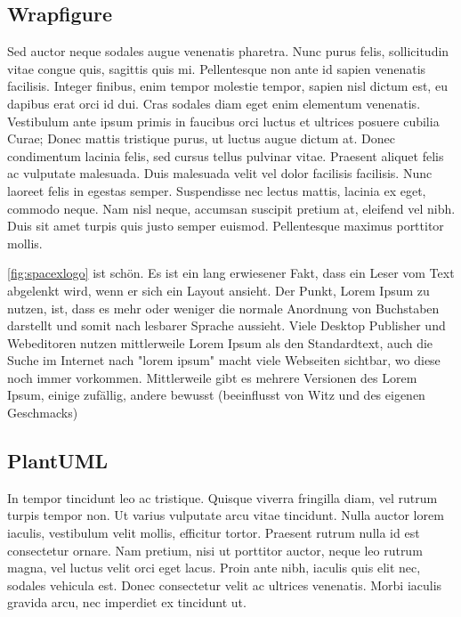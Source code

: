 \documentclass[%
    auto-generate   = true,             %
    debug           = true,             %
    print-ndn       = true,             %
    print-loa       = true,             %
    print-lof       = true,             %
    print-lot       = true,             %
    print-lol       = true,             %
    bib-file        = literature.bib,   %
    plantuml        = true,             %
    title-style     = default,          %
    font-size       = 12pt              %
]{udhbwvst}
\begin{document}
\subsection{Wrapfigure}

Sed auctor neque sodales augue venenatis pharetra. Nunc purus felis, sollicitudin vitae congue quis, sagittis quis mi. Pellentesque non ante id sapien venenatis facilisis. Integer finibus, enim tempor molestie tempor, sapien nisl dictum est, eu dapibus erat orci id dui. Cras sodales diam eget enim elementum venenatis. Vestibulum ante ipsum primis in faucibus orci luctus et ultrices posuere cubilia Curae; Donec mattis tristique purus, ut luctus augue dictum at. Donec condimentum lacinia felis, sed cursus tellus pulvinar vitae. Praesent aliquet felis ac vulputate malesuada. Duis malesuada velit vel dolor facilisis facilisis. Nunc laoreet felis in egestas semper. Suspendisse nec lectus mattis, lacinia ex eget, commodo neque. Nam nisl neque, accumsan suscipit pretium at, eleifend vel nibh. Duis sit amet turpis quis justo semper euismod. Pellentesque maximus porttitor mollis. 


\autoref{fig:spacexlogo} ist schön. Es ist ein lang erwiesener Fakt, dass ein Leser vom Text abgelenkt wird, wenn er sich ein Layout ansieht. Der Punkt, Lorem Ipsum zu nutzen, ist, dass es mehr oder weniger die normale Anordnung von Buchstaben darstellt und somit nach lesbarer Sprache aussieht. Viele Desktop Publisher und Webeditoren nutzen mittlerweile Lorem Ipsum als den Standardtext, auch die Suche im Internet nach "lorem ipsum" macht viele Webseiten sichtbar, wo diese noch immer vorkommen. Mittlerweile gibt es mehrere Versionen des Lorem Ipsum, einige zufällig, andere bewusst (beeinflusst von Witz und des eigenen Geschmacks)

\subsection{PlantUML}

In tempor tincidunt leo ac tristique. Quisque viverra fringilla diam, vel rutrum turpis tempor non. Ut varius vulputate arcu vitae tincidunt. Nulla auctor lorem iaculis, vestibulum velit mollis, efficitur tortor. Praesent rutrum nulla id est consectetur ornare. Nam pretium, nisi ut porttitor auctor, neque leo rutrum magna, vel luctus velit orci eget lacus. Proin ante nibh, iaculis quis elit nec, sodales vehicula est. Donec consectetur velit ac ultrices venenatis. Morbi iaculis gravida arcu, nec imperdiet ex tincidunt ut. 
\end{document}
